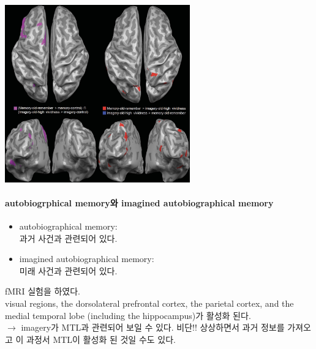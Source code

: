 \documentclass[../note.tex]{subfiles}
\begin{document}
{  \begin{center}
    \includegraphics[width=0.6\textwidth]{image/ch8_result3}
    \label{fig:ch8_result3}
  \end{center}
}

\paragraph{autobiogrphical memory와 imagined autobiographical memory}
\begin{itemize}
  \item autobiographical memory:\\
    과거 사건과 관련되어 있다.
  \item imagined autobiographical memory:\\
    미래 사건과 관련되어 있다.
\end{itemize}

fMRI 실험을 하였다.\\
visual regions, the dorsolateral prefrontal cortex, the parietal cortex,
and the medial temporal lobe (including the hippocampus)가 활성화 된다.\\
$\longrightarrow$ imagery가 MTL과 관련되어 보일 수 있다. 비단!! 상상하면서 과거 정보를 가져오고 이 과정서 MTL이 활성화 된 것일 수도 있다.
\end{document}
